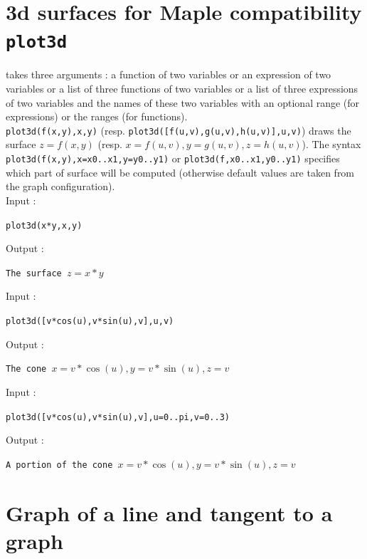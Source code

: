 \documentclass[a4paper,11pt]{book}
\begin{document}
\section{3d surfaces for Maple compatibility {\tt plot3d}}
 takes three arguments : a function of two variables or 
an expression of two variables  or a list of three functions of two variables 
or a list of three expressions of two variables and the names of these two 
variables with an optional range (for expressions) or the ranges 
(for functions).\\
{\tt plot3d(f(x,y),x,y)} (resp. {\tt plot3d([f(u,v),g(u,v),h(u,v)],u,v)}) draws 
the surface $z=f(x,y)$ (resp. $x=f(u,v),y=g(u,v),z=h(u,v)$).
The syntax {\tt plot3d(f(x,y),x=x0..x1,y=y0..y1)} or 
{\tt plot3d(f,x0..x1,y0..y1)} specifies which part of surface 
will be computed (otherwise default values are taken from the graph
configuration).\\ 
Input :
\begin{center}{\tt plot3d(x*y,x,y)}\end{center}
Output :
\begin{center}{\tt The surface $z=x*y$}\end{center}
Input :
\begin{center}{\tt plot3d([v*cos(u),v*sin(u),v],u,v) }\end{center}
Output :
\begin{center}{\tt The cone $x=v*\cos(u),y=v*\sin(u),z=v$}\end{center}
Input :
\begin{center}{\tt plot3d([v*cos(u),v*sin(u),v],u=0..pi,v=0..3)}\end{center}
Output :
\begin{center}{\tt A portion of the cone $x=v*\cos(u),y=v*\sin(u),z=v$}\end{center}

\section{Graph of a line and tangent to a graph}
\end{document}
